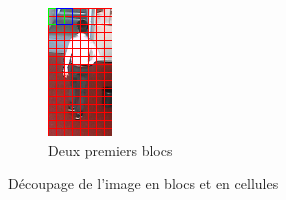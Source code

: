 \documentclass[11pt]{article}
\begin{document}
\begin{figure}[!ht]
\begin{subfigure}{.3\textwidth}
  \includegraphics[width=.8\linewidth]{block.png}
  \caption{Deux premiers blocs}
  \label{fig:kernel_sy}
\end{subfigure}
\caption{Découpage de l'image en blocs et en cellules}
\label{fig:kernels}
\end{figure}
\end{document}
